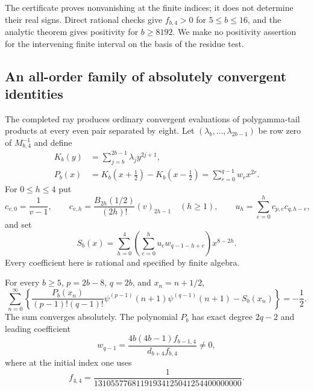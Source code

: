 The certificate proves nonvanishing at the finite indices; it does
not determine their real signs.  Direct rational checks give
$f_{b,4}>0$ for $5\le b\le16$, and the analytic theorem gives
positivity for $b\ge8192$.  We make no positivity assertion for
the intervening finite interval on the basis of the residue test.

\subsection{An all-order family of absolutely convergent identities}

The completed ray produces ordinary convergent evaluations of
polygamma-tail products at every even pair separated by eight.
Let $(\lambda_b,\ldots,\lambda_{2b-1})$ be row zero of
$M_{b,4}^{-1}$ and define
\begin{align*}
 K_b(y)&=\sum_{j=b}^{2b-1}\lambda_jy^{2j+1},\\
 P_b(x)&=K_b(x+\tfrac12)-K_b(x-\tfrac12)
             =\sum_{r=0}^{q-1}w_rx^{2r}.
\end{align*}
For $0\le h\le4$ put
\[
 c_{v,0}=\frac1{v-1},\qquad
 c_{v,h}=\frac{B_{2h}(1/2)}{(2h)!}(v)_{2h-1}\quad(h\ge1),
 \qquad u_h=\sum_{e=0}^h c_{p,e}c_{q,h-e},
\]
and set
\[
 S_b(x)=\sum_{h=0}^4
       \left(\sum_{e=0}^h u_e w_{q-1-h+e}\right)x^{8-2h}.
\]
Every coefficient here is rational and specified by finite algebra.

\begin{corollary}
\label{eg:eight-identities}
For every $b\ge5$, $p=2b-8$, $q=2b$, and $x_n=n+1/2$,
\begin{equation}\label{eg:eight-sum}
 \boxed{\displaystyle
 \sum_{n=0}^{\infty}\left\{
 \frac{P_b(x_n)}{(p-1)!(q-1)!}
       \psi^{(p-1)}(n+1)\psi^{(q-1)}(n+1)-S_b(x_n)
                         \right\}=-\frac12.}
\end{equation}
The sum converges absolutely.  The polynomial $P_b$ has exact degree
$2q-2$ and leading coefficient
\begin{equation}\label{eg:leading}
 w_{q-1}=\frac{4b(4b-1)f_{b-1,4}}{d_{b+4}f_{b,4}}\ne0,
\end{equation}
where at the initial index one uses
\[
 f_{4,4}=\frac1{13105577681191934125041254400000000}.
\]
\end{corollary}

